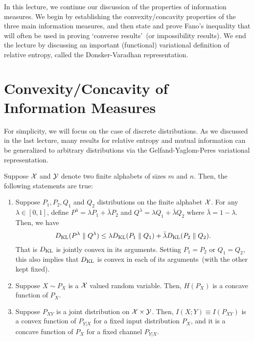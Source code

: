\documentclass[12pt]{article}
\begin{document}
	\MakeScribeTop

In this lecture, we continue our discussion of the properties of information measures. We begin by establishing the convexity/concavity properties of the three main information measures, and then state and prove Fano's inequality that will often be used in proving `converse results'~(or impossibility results). We end the lecture by discussing an important (functional) variational definition of relative entropy, called the Donsker-Varadhan representation. 

\section{Convexity/Concavity of Information Measures}

For simplicity, we will focus on the case of discrete distributions. As we discussed in the last lecture, many results for relative entropy and mutual information can be generalized to arbitrary distributions via the Gelfand-Yaglom-Peres variational representation. 

\begin{theorem}
	\label{theorem:convexity-concavity-of-information-measures}
	Suppose ${\cal X}$ and ${\cal Y}$ denote two finite alphabets of sizes $m$ and $n$. Then, the following statements are true: 
	\begin{enumerate}
		\item Suppose $P_1, P_2, Q_1$ and $Q_2$ distributions on the finite alphabet ${\cal X}$. For any $\lambda \in [0,1]$, define $P^\lambda = \lambda P_1 + \bar{\lambda} P_2$ and $Q^\lambda = \lambda Q_1 + \bar{\lambda} Q_2$ where $\bar{\lambda} = 1-\lambda$. Then, we have 
		\begin{align}
			D_{\text{KL}}(P^\lambda \parallel Q^\lambda) \leq \lambda D_{\text{KL}}(P_1 \parallel Q_1) + \bar{\lambda} D_{\text{KL}}(P_2 \parallel Q_2). 
		\end{align}
		That is $D_{\text{KL}}$ is jointly convex in its arguments. Setting $P_1 = P_2$ or $Q_1=Q_2$, this also implies that $D_{\text{KL}}$ is convex in each of its arguments~(with the other kept fixed). 
		\item Suppose $X \sim P_X$ is a ${\cal X}$ valued random variable. Then, $H(P_X)$ is a concave function of $P_X$.  
		\item Suppose $P_{XY}$ is a joint distribution on ${\cal X} \times {\cal Y}$. Then, $I(X; Y) \equiv I(P_{XY})$ is a convex function of $P_{Y|X}$ for a fixed input distribution $P_X$, and it is a concave function of $P_{X}$ for a fixed channel $P_{Y|X}$. 
	\end{enumerate}
\end{theorem}
\end{document}
